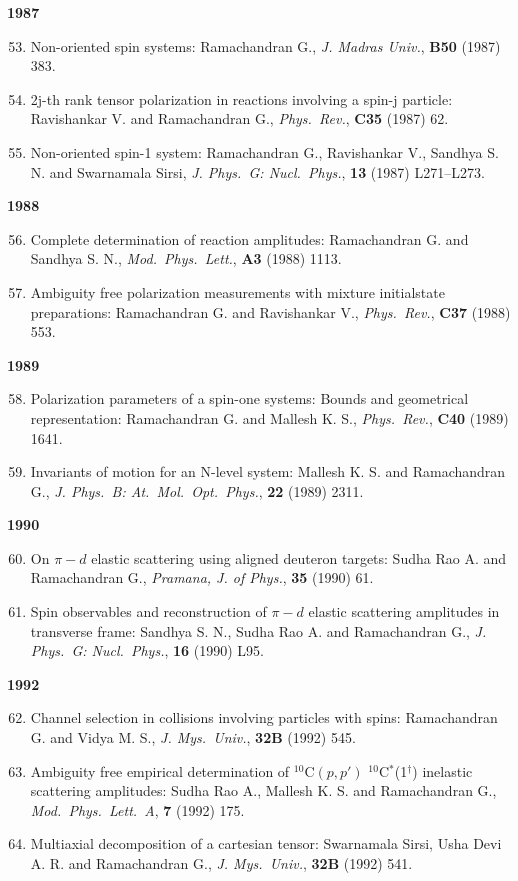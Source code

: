 \textbf{1987}
\begin{enumerate}
\setcounter{enumi}{52}
\item Non-oriented spin systems: Ramachandran G., \textit{J. Madras Univ.}, {\bf B50} (1987) 383.
\item 2j-th rank tensor polarization in reactions involving a spin-j particle: Ravishankar V. and Ramachandran G., \textit{Phys.\ Rev.}, {\bf C35} (1987) 62.
\item Non-oriented spin-1 system: Ramachandran G., Ravishankar V., Sandhya S. N. and Swarnamala Sirsi, \textit{J. Phys.\ G: Nucl.\ Phys.}, {\bf 13} (1987) L271--L273.
\end{enumerate}
\textbf{1988}
\begin{enumerate}
\setcounter{enumi}{55}
\item Complete determination of reaction amplitudes: Ramachandran G. and Sandhya S. N., \textit{Mod.\ Phys.\ Lett.}, {\bf A3} (1988) 1113.
\item Ambiguity free polarization measurements with mixture initial\break state preparations: Ramachandran G. and Ravishankar V., \textit{Phys.\ Rev.}, {\bf C37} (1988) 553.
\end{enumerate}
\textbf{1989}
\begin{enumerate}
\setcounter{enumi}{57}
\item Polarization parameters of a spin-one systems: Bounds and geometrical representation: Ramachandran G. and Mallesh K. S., \textit{Phys.\ Rev.}, {\bf C40} (1989) 1641.
\item Invariants of motion for an N-level system: Mallesh K. S. and Ramachandran G., \textit{J. Phys.\ B: At.\ Mol.\ Opt.\ Phys.}, {\bf 22} (1989) 2311.
\end{enumerate}
\textbf{1990}
\begin{enumerate}
\setcounter{enumi}{59}
\item On $\pi-d$ elastic scattering using aligned deuteron targets: Sudha Rao A. and Ramachandran G., \textit{Pramana, J. of Phys.}, {\bf 35} (1990) 61.
\item Spin observables and reconstruction of $\pi-d$ elastic scattering amplitudes in transverse frame: Sandhya S. N., Sudha Rao A. and Ramachandran G., \textit{J. Phys.\ G: Nucl.\ Phys.}, {\bf 16} (1990) L95.
\end{enumerate}
\textbf{1992}
\begin{enumerate}
\setcounter{enumi}{61}
\item Channel selection in collisions involving particles with spins: Ramachandran G. and Vidya M. S., \textit{J. Mys.\ Univ.}, {\bf 32B} (1992) 545.
\item Ambiguity free empirical determination of $^{10}$C$(p, p')$ $^{10}$C$^{*}$(1$^{\dagger}$) inelastic scattering amplitudes: Sudha Rao A., Mallesh K. S. and Ramachandran G., \textit{Mod.\ Phys.\ Lett.\ A}, {\bf 7} (1992) 175.
\item Multiaxial decomposition of a cartesian tensor: Swarnamala Sirsi, Usha Devi A. R. and Ramachandran G., \textit{J. Mys.\ Univ.}, {\bf 32B} (1992) 541.
\end{enumerate}
